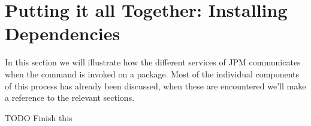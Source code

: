 \section{Putting it all Together: Installing Dependencies}

In this section we will illustrate how the different services of JPM
communicates when the  command is invoked on a package. Most of
the individual components of this process has already been discussed, when
these are encountered we'll make a reference to the relevant sections.

TODO Finish this
